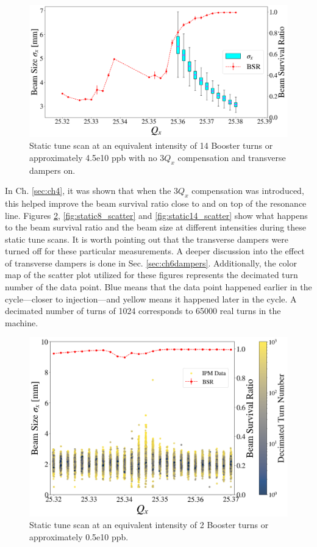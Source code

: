 \begin{figure}[H]
    \centering
    \includegraphics[width=\columnwidth]{chapter6/static14turns_BARE_dampersON.png}
    \caption{Static tune scan at an equivalent intensity of 14 Booster turns or approximately 4.5e10 ppb with no $3Q_x$ compensation and transverse dampers on.}
    \label{fig:static14_bare}
\end{figure}

In Ch. \ref{sec:ch4}, it was shown that when the $3Q_x$ compensation was introduced, this helped improve the beam survival ratio close to and on top of the resonance line. Figures \ref{fig:static2_scatter}, \ref{fig:static8_scatter} and \ref{fig:static14_scatter} show what happens to the beam survival ratio and the beam size at different intensities during these static tune scans. It is worth pointing out that the transverse dampers were turned off for these particular measurements. A deeper discussion into the effect of transverse dampers is done in Sec. \ref{sec:ch6dampers}. Additionally, the color map of the scatter plot utilized for these figures represents the decimated turn number of the data point. Blue means that the data point happened earlier in the cycle---closer to injection---and yellow means it happened later in the cycle. A decimated number of turns of 1024 corresponds to 65000 real turns in the machine.

\begin{figure}[H]
    \centering
    \includegraphics[width=\columnwidth]{chapter6/static2turns_dampersOFF.png}
    \caption{Static tune scan at an equivalent intensity of 2 Booster turns or approximately 0.5e10 ppb.}
    \label{fig:static2_scatter}
\end{figure}

